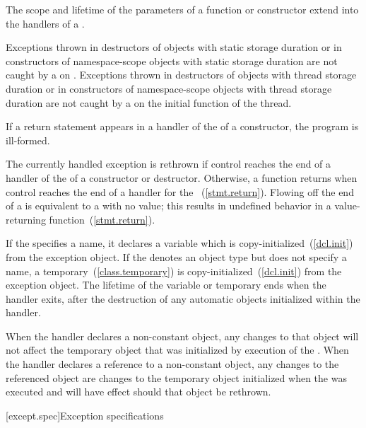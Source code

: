 \pnum
The scope and lifetime of the parameters of a function or constructor
extend into the handlers of a
.

\pnum
Exceptions thrown in destructors of objects with static storage duration or in
constructors of namespace-scope objects with static storage duration are not caught by a
on
. Exceptions thrown in destructors of objects with thread storage duration or in constructors of namespace-scope objects with thread storage duration are not caught by a
on the initial function of the thread.

\pnum
If a return statement appears in a handler of the
of a
constructor, the program is ill-formed.

\pnum
The currently handled exception
is rethrown if control reaches the end of a handler of the
of a constructor or destructor.
Otherwise, a
function returns when control reaches the end of a handler for
the
~(\ref{stmt.return}).
Flowing off the end of a
is equivalent to a
with no value;
this results in undefined behavior in a value-returning function~(\ref{stmt.return}).

\pnum
If the  specifies a name, it declares a
variable which is copy-initialized~(\ref{dcl.init}) from the exception object.
If the  denotes an object type but
 does not specify a name, a
temporary~(\ref{class.temporary}) is copy-initialized~(\ref{dcl.init}) from the
exception object.
The lifetime of the variable or temporary ends
when the handler exits, after the
destruction of any automatic objects initialized
within the handler.

\pnum
When the handler declares a non-constant object,
any changes to that object will not affect the temporary object
that was initialized by execution of the
.
When the handler declares a reference to a non-constant object,
any changes to the referenced object are changes to the
temporary object initialized when the
was executed and will have effect should that object be rethrown.%
%

[except.spec]{Exception specifications}%

